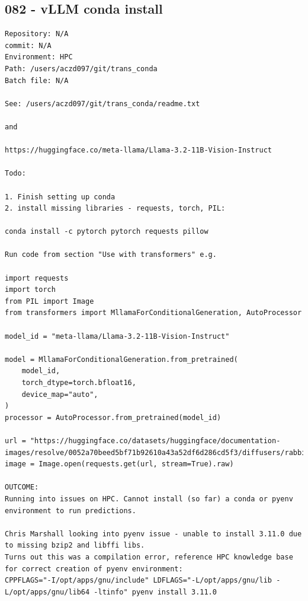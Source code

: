 \subsection{082 - vLLM conda install}
\label{app_res:082}
\begin{verbatim}
Repository: N/A
commit: N/A
Environment: HPC 
Path: /users/aczd097/git/trans_conda
Batch file: N/A

See: /users/aczd097/git/trans_conda/readme.txt

and

https://huggingface.co/meta-llama/Llama-3.2-11B-Vision-Instruct

Todo: 

1. Finish setting up conda
2. install missing libraries - requests, torch, PIL:

conda install -c pytorch pytorch requests pillow

Run code from section "Use with transformers" e.g.

import requests
import torch
from PIL import Image
from transformers import MllamaForConditionalGeneration, AutoProcessor

model_id = "meta-llama/Llama-3.2-11B-Vision-Instruct"

model = MllamaForConditionalGeneration.from_pretrained(
    model_id,
    torch_dtype=torch.bfloat16,
    device_map="auto",
)
processor = AutoProcessor.from_pretrained(model_id)

url = "https://huggingface.co/datasets/huggingface/documentation-images/resolve/0052a70beed5bf71b92610a43a52df6d286cd5f3/diffusers/rabbit.jpg"
image = Image.open(requests.get(url, stream=True).raw)

OUTCOME:
Running into issues on HPC. Cannot install (so far) a conda or pyenv environment to run predictions.

Chris Marshall looking into pyenv issue - unable to install 3.11.0 due to missing bzip2 and libffi libs.
Turns out this was a compilation error, reference HPC knowledge base for correct creation of pyenv environment:
CPPFLAGS="-I/opt/apps/gnu/include" LDFLAGS="-L/opt/apps/gnu/lib -L/opt/apps/gnu/lib64 -ltinfo" pyenv install 3.11.0

\end{verbatim}

